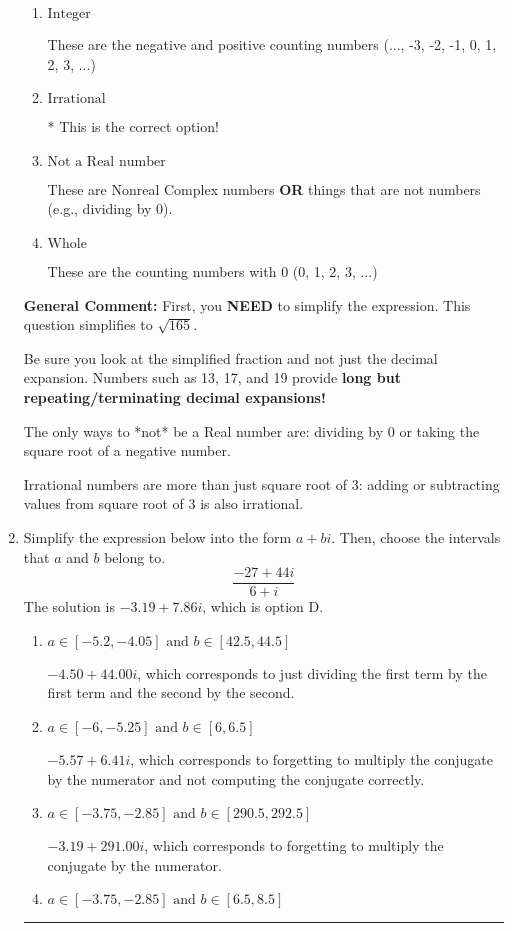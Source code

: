 \documentclass{extbook}[14pt]
\newcommand{\litem}[1]{\item #1

\rule{\textwidth}{0.4pt}}
\begin{document}
\begin{enumerate}
{\begin{enumerate}[label=\Alph*.]
These are numbers that can be written as fraction of Integers (e.g., -2/3)
\item \( \text{Integer} \)

These are the negative and positive counting numbers (..., -3, -2, -1, 0, 1, 2, 3, ...)
\item \( \text{Irrational} \)

* This is the correct option!
\item \( \text{Not a Real number} \)

These are Nonreal Complex numbers \textbf{OR} things that are not numbers (e.g., dividing by 0).
\item \( \text{Whole} \)

These are the counting numbers with 0 (0, 1, 2, 3, ...)
\end{enumerate}

\textbf{General Comment:} First, you \textbf{NEED} to simplify the expression. This question simplifies to $\sqrt{165}$. 
 
 Be sure you look at the simplified fraction and not just the decimal expansion. Numbers such as 13, 17, and 19 provide \textbf{long but repeating/terminating decimal expansions!} 
 
 The only ways to *not* be a Real number are: dividing by 0 or taking the square root of a negative number. 
 
 Irrational numbers are more than just square root of 3: adding or subtracting values from square root of 3 is also irrational.
}
\litem{
Simplify the expression below into the form $a+bi$. Then, choose the intervals that $a$ and $b$ belong to.
\[ \frac{-27 + 44 i}{6 + i} \]
The solution is \( -3.19  + 7.86 i \), which is option D.\begin{enumerate}[label=\Alph*.]
\item \( a \in [-5.2, -4.05] \text{ and } b \in [42.5, 44.5] \)

 $-4.50  + 44.00 i$, which corresponds to just dividing the first term by the first term and the second by the second.
\item \( a \in [-6, -5.25] \text{ and } b \in [6, 6.5] \)

 $-5.57  + 6.41 i$, which corresponds to forgetting to multiply the conjugate by the numerator and not computing the conjugate correctly.
\item \( a \in [-3.75, -2.85] \text{ and } b \in [290.5, 292.5] \)

 $-3.19  + 291.00 i$, which corresponds to forgetting to multiply the conjugate by the numerator.
\item \( a \in [-3.75, -2.85] \text{ and } b \in [6.5, 8.5] \)


\end{enumerate}}
\end{enumerate}
\end{document}
